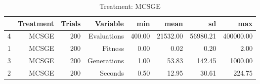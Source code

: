 \begin{table}[ht]
\centering
\begin{tabular}{rrrrrrrr}
  \hline
 & Treatment & Trials & Variable & min & mean & sd & max \\ 
  \hline
4 & MCSGE & 200 & Evaluations & 400.00 & 21532.00 & 56980.21 & 400000.00 \\ 
  1 & MCSGE & 200 & Fitness & 0.00 & 0.02 & 0.20 & 2.00 \\ 
  3 & MCSGE & 200 & Generations & 1.00 & 53.83 & 142.45 & 1000.00 \\ 
  2 & MCSGE & 200 & Seconds & 0.50 & 12.95 & 30.61 & 224.75 \\ 
   \hline
\end{tabular}
\caption{Treatment: MCSGE} 
\end{table}
